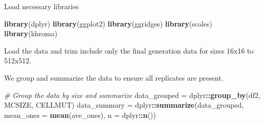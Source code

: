 \documentclass[
]{book}
\newenvironment{Shaded}{\begin{snugshade}}{\end{snugshade}}
\newcommand{\CommentTok}[1]{\textcolor[rgb]{0.56,0.35,0.01}{\textit{#1}}}
\newcommand{\DataTypeTok}[1]{\textcolor[rgb]{0.13,0.29,0.53}{#1}}
\newcommand{\DecValTok}[1]{\textcolor[rgb]{0.00,0.00,0.81}{#1}}
\newcommand{\KeywordTok}[1]{\textcolor[rgb]{0.13,0.29,0.53}{\textbf{#1}}}
\newcommand{\NormalTok}[1]{#1}
\newcommand{\OperatorTok}[1]{\textcolor[rgb]{0.81,0.36,0.00}{\textbf{#1}}}
\newcommand{\StringTok}[1]{\textcolor[rgb]{0.31,0.60,0.02}{#1}}
\begin{document}
Load necessary libraries

\begin{Shaded}
\begin{Highlighting}[]
\KeywordTok{library}\NormalTok{(dplyr)}
\KeywordTok{library}\NormalTok{(ggplot2)}
\KeywordTok{library}\NormalTok{(ggridges)}
\KeywordTok{library}\NormalTok{(scales)}
\KeywordTok{library}\NormalTok{(khroma)}
\end{Highlighting}
\end{Shaded}

Load the data and trim include only the final generation data for sizes 16x16 to 512x512.

\begin{Shaded}
\end{Shaded}

We group and summarize the data to ensure all replicates are present.

\begin{Shaded}
\begin{Highlighting}[]
\CommentTok{\# Group the data by size and summarize}
\NormalTok{data\_grouped =}\StringTok{ }\NormalTok{dplyr}\OperatorTok{::}\KeywordTok{group\_by}\NormalTok{(df2, MCSIZE, CELLMUT)}
\NormalTok{data\_summary =}\StringTok{ }\NormalTok{dplyr}\OperatorTok{::}\KeywordTok{summarize}\NormalTok{(data\_grouped, }\DataTypeTok{mean\_ones =} \KeywordTok{mean}\NormalTok{(ave\_ones), }\DataTypeTok{n =}\NormalTok{ dplyr}\OperatorTok{::}\KeywordTok{n}\NormalTok{())}
\end{Highlighting}
\end{Shaded}
\end{document}
